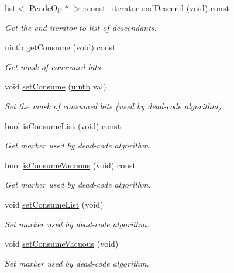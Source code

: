 \begin{DoxyCompactItemize}
list$<$ \mbox{\hyperlink{class_pcode_op}{Pcode\+Op}} $\ast$ $>$\+::const\+\_\+iterator \mbox{\hyperlink{class_varnode_a482e4fb67c20ad6bdf9141437866b8ea}{end\+Descend}} (void) const
\begin{DoxyCompactList}\small\item\em Get the end iterator to list of descendants. \end{DoxyCompactList}\item 
\mbox{\hyperlink{types_8h_a2db313c5d32a12b01d26ac9b3bca178f}{uintb}} \mbox{\hyperlink{class_varnode_a3ca2401a56061b28f66d2231686c4780}{get\+Consume}} (void) const
\begin{DoxyCompactList}\small\item\em Get mask of consumed bits. \end{DoxyCompactList}\item 
void \mbox{\hyperlink{class_varnode_a809aa02a00ff30f8348009bb31c2499a}{set\+Consume}} (\mbox{\hyperlink{types_8h_a2db313c5d32a12b01d26ac9b3bca178f}{uintb}} val)
\begin{DoxyCompactList}\small\item\em Set the mask of consumed bits (used by dead-\/code algorithm) \end{DoxyCompactList}\item 
bool \mbox{\hyperlink{class_varnode_a18e8215dbe1ec41e782276e4c3947b6d}{is\+Consume\+List}} (void) const
\begin{DoxyCompactList}\small\item\em Get marker used by dead-\/code algorithm. \end{DoxyCompactList}\item 
bool \mbox{\hyperlink{class_varnode_ae419a0ef231d9f94fbd5460fe24e0717}{is\+Consume\+Vacuous}} (void) const
\begin{DoxyCompactList}\small\item\em Get marker used by dead-\/code algorithm. \end{DoxyCompactList}\item 
void \mbox{\hyperlink{class_varnode_a5efe867c5c6e0569fc73e42bd3dbfaaf}{set\+Consume\+List}} (void)
\begin{DoxyCompactList}\small\item\em Set marker used by dead-\/code algorithm. \end{DoxyCompactList}\item 
void \mbox{\hyperlink{class_varnode_ae4566fd118bbbbc625b10861e35ee312}{set\+Consume\+Vacuous}} (void)
\begin{DoxyCompactList}\small\item\em Set marker used by dead-\/code algorithm. \end{DoxyCompactList}\item 

\end{DoxyCompactItemize}
